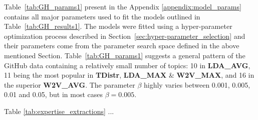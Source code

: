         Table~\ref{tab:GH_params1} present in the Appendix \ref{appendix:model_params} contains all major parameters used to fit the models outlined in Table~\ref{tab:GH_results1}. The models were fitted using a hyper-parameter optimization process described in Section~\ref{sec:hyper-parameter_selection} and their parameters come from the parameter search space defined in the above mentioned Section. Table~\ref{tab:GH_params1} suggests a general pattern of the GitHub data containing a relatively small number of topics: 10 in \textbf{LDA\_AVG}, 11 being the most popular in \textbf{TDistr}, \textbf{LDA\_MAX} \& \textbf{W2V\_MAX}, and 16 in the superior \textbf{W2V\_AVG}. The parameter $\beta$ highly varies between 0.001, 0.005, 0.01 and 0.05, but in most cases $\beta=0.005$.
        
        Table \ref{tab:expertise_extractions} ...
        
